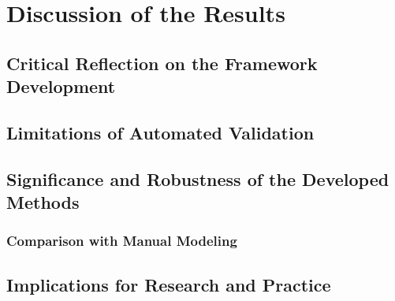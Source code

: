 \chapter{Discussion of the Results}
\label{chap:discussion}

\section{Critical Reflection on the Framework Development}

\section{Limitations of Automated Validation}

\section{Significance and Robustness of the Developed Methods}
\subsection{Comparison with Manual Modeling}

\section{Implications for Research and Practice}
